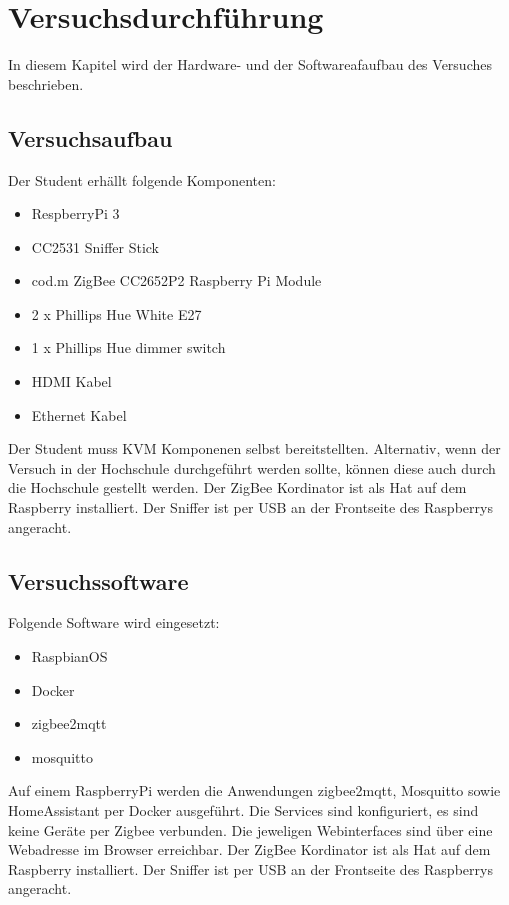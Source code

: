 \chapter{Versuchsdurchführung}

In diesem Kapitel wird der Hardware- und der Softwareafaufbau des Versuches beschrieben.

\section{Versuchsaufbau}

Der Student erhällt folgende Komponenten:
\begin{itemize}
    \item RespberryPi 3
    \item CC2531 Sniffer Stick
    \item cod.m ZigBee CC2652P2 Raspberry Pi Module
    \item 2 x Phillips Hue White E27
    \item 1 x Phillips Hue dimmer switch
    \item HDMI Kabel
    \item Ethernet Kabel
\end{itemize}

Der Student muss KVM Komponenen selbst bereitstellten. Alternativ, wenn der Versuch in der Hochschule durchgeführt werden sollte,
können diese auch durch die Hochschule gestellt werden. Der ZigBee Kordinator ist als \grqq Hat \grqq{} auf dem Raspberry installiert. Der Sniffer ist per USB an der 
Frontseite des Raspberrys angeracht.

\section{Versuchssoftware}

Folgende Software wird eingesetzt:
\begin{itemize}
    \item RaspbianOS
    \item Docker
    \item zigbee2mqtt
    \item mosquitto
\end{itemize}

Auf einem RaspberryPi werden die Anwendungen zigbee2mqtt, Mosquitto sowie HomeAssistant per Docker ausgeführt. Die
Services sind konfiguriert, es sind keine Geräte per Zigbee verbunden. 
Die jeweligen Webinterfaces sind über eine Webadresse im Browser erreichbar. Der ZigBee Kordinator ist als \grqq Hat \grqq{}
auf dem Raspberry installiert. Der Sniffer ist per USB an der Frontseite des Raspberrys angeracht.  

